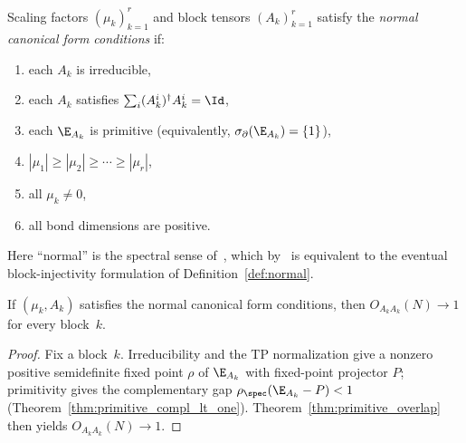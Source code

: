 \begin{definition}\label{def:is_normal_canonical_form}
    \leanok
    Scaling factors $(\mu_k)_{k=1}^r$ and block tensors $(A_k)_{k=1}^r$ satisfy
    the \emph{normal canonical form conditions} if:
    \begin{enumerate}
        \item each $A_k$ is irreducible,
        \item each $A_k$ satisfies $\sum_i (A_k^i)^\dagger A_k^i = \Id$,
        \item each $\E_{A_k}$ is primitive
              (equivalently, $\sigma_\partial(\E_{A_k}) = \{1\}$),
        \item $|\mu_1| \ge |\mu_2| \ge \cdots \ge |\mu_r|$,
        \item all $\mu_k \neq 0$,
        \item all bond dimensions are positive.
    \end{enumerate}
    Here ``normal'' is the spectral sense of~\cite{Cirac2016MPDO_arXiv}, which
    by~\cite[Proposition~3]{Sanz2010Quantum} is equivalent to the eventual
    block-injectivity formulation of Definition~\ref{def:normal}.
\end{definition}


\begin{theorem}%
    \label{thm:ncf_overlap_tendsto_one}
    \leanok
    If $(\mu_k, A_k)$ satisfies the normal canonical form conditions, then
    $O_{A_k A_k}(N) \to 1$ for every block~$k$.
\end{theorem}

\begin{proof}\leanok
    Fix a block~$k$. Irreducibility and the TP normalization give a nonzero
    positive semidefinite fixed point $\rho$ of $\E_{A_k}$ with fixed-point
    projector $P$; primitivity gives the complementary gap
    $\rho_{\spec}(\E_{A_k}-P) < 1$ (Theorem~\ref{thm:primitive_compl_lt_one}).
    Theorem~\ref{thm:primitive_overlap} then yields $O_{A_k A_k}(N) \to 1$.
\end{proof}


